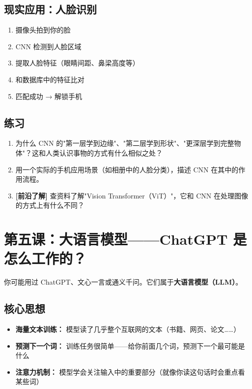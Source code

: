 \documentclass[a4paper,12pt]{ctexart}
\begin{document}
\subsection*{现实应用：人脸识别}

\begin{enumerate}
  \item 摄像头拍到你的脸
  \item CNN 检测到人脸区域
  \item 提取人脸特征（眼睛间距、鼻梁高度等）
  \item 和数据库中的特征比对
  \item 匹配成功 → 解锁手机
\end{enumerate}

\subsection*{练习}

\begin{enumerate}
  \item 为什么 CNN 的"第一层学到边缘"、"第二层学到形状"、"更深层学到完整物体"？这和人类认识事物的方式有什么相似之处？
  \item 用一个实际的手机应用场景（如相册中的人脸分类），描述 CNN 在其中的作用流程。
  \item \textbf{[前沿了解]} 查资料了解"Vision Transformer（ViT）"，它和 CNN 在处理图像的方式上有什么不同？
\end{enumerate}

\section*{第五课：大语言模型——ChatGPT 是怎么工作的？}

你可能用过 ChatGPT、文心一言或通义千问。它们属于\textbf{大语言模型（LLM）}。

\subsection*{核心思想}

\begin{itemize}
  \item \textbf{海量文本训练：} 模型读了几乎整个互联网的文本（书籍、网页、论文……）
  \item \textbf{预测下一个词：} 训练任务很简单——给你前面几个词，预测下一个最可能是什么
  \item \textbf{注意力机制：} 模型学会关注输入中的重要部分（就像你读这句话时会重点看某些词）
\end{itemize}
\end{document}
